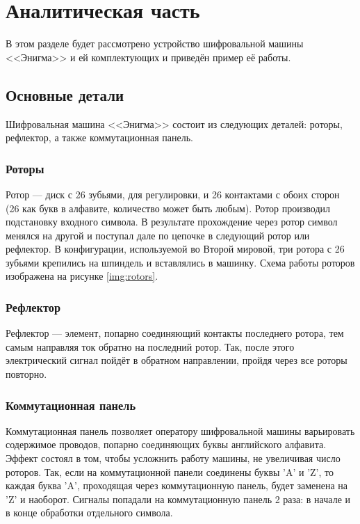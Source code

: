 \chapter{Аналитическая часть}
В этом разделе будет рассмотрено устройство шифровальной машины <<Энигма>> и ей комплектующих и приведён пример её работы.


\section{Основные детали}

Шифровальная машина <<Энигма>> состоит из следующих деталей: роторы, рефлектор, а также коммутационная панель.

\subsection{Роторы}

Ротор --- диск с 26 зубьями, для регулировки, и 26 контактами с обоих сторон (26 как букв в алфавите, количество может быть любым). Ротор производил подстановку входного символа. В результате прохождение через ротор символ менялся на другой и поступал дале по цепочке в следующий ротор или рефлектор. В конфигурации, используемой во Второй мировой, три ротора с 26 зубьями крепились на шпиндель и вставлялись в машинку. Схема работы роторов изображена на рисунке \ref{img:rotors}.


\FloatBarrier


\subsection{Рефлектор}

Рефлектор --- элемент, попарно соединяющий контакты последнего ротора, тем самым направляя ток обратно на последний ротор. Так, после этого электрический сигнал пойдёт в обратном направлении, пройдя через все роторы повторно. 

\subsection{Коммутационная панель}

Коммутационная панель позволяет оператору шифровальной машины варьировать содержимое проводов, попарно соединяющих буквы английского алфавита. Эффект состоял в том, чтобы усложнить работу машины, не увеличивая число роторов. Так, если на коммутационной панели соединены буквы 'A' и 'Z', то каждая буква 'A', проходящая через коммутационную панель, будет заменена на 'Z'  и наоборот. Сигналы попадали на коммутационную панель 2 раза: в начале и в конце обработки отдельного символа.

